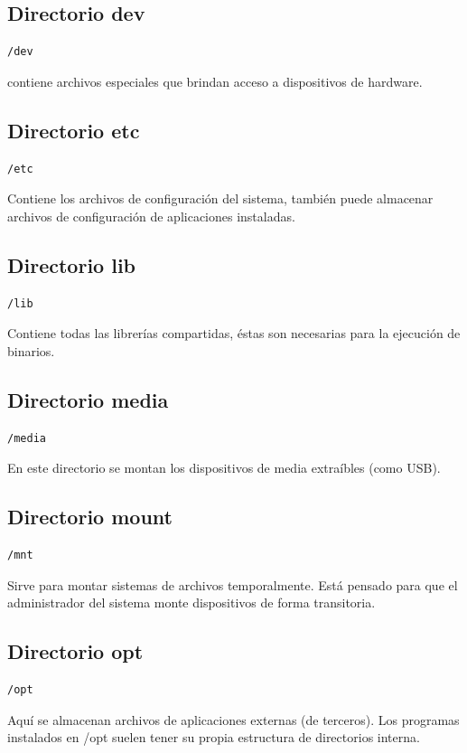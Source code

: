 \subsection{Directorio dev}
\begin{lstlisting}
/dev
\end{lstlisting}
contiene archivos especiales que brindan acceso a dispositivos de hardware.

\subsection{Directorio etc}
\begin{lstlisting}
/etc
\end{lstlisting}
Contiene los archivos de configuración del sistema, también puede almacenar archivos de configuración de aplicaciones instaladas.

\subsection{Directorio lib}
\begin{lstlisting}
/lib
\end{lstlisting}
Contiene todas las librerías compartidas, éstas son necesarias para la ejecución de binarios.

\subsection{Directorio media}
\begin{lstlisting}
/media
\end{lstlisting}
En este directorio se montan los dispositivos de media extraíbles (como USB).

\subsection{Directorio mount}
\begin{lstlisting}
/mnt
\end{lstlisting}
Sirve para montar sistemas de archivos temporalmente. Está pensado para que el administrador del sistema monte dispositivos de forma transitoria.

\subsection{Directorio opt}
\begin{lstlisting}
/opt
\end{lstlisting}
Aquí se almacenan archivos de aplicaciones externas (de terceros). Los programas instalados en /opt suelen tener su propia estructura de directorios interna.


